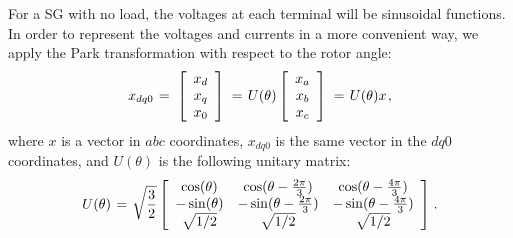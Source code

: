 \documentclass[letterpaper, 10 pt, conference]{ieeeconf}
\newcommand{\m}      {{\hbox{\hskip 1pt}}}
\begin{document}
For a SG with no load, the voltages at each terminal
will be sinusoidal functions. In order to represent the voltages and
currents in a more convenient way, we apply the Park transformation
with respect to the rotor angle:
$$ x_{dq0} \m=\m \left[\begin{array}{c} x_{d}\\ x_{q}\\ x_{0}
   \end{array}\right] \m=\m U(\theta) \left[\begin{array}{c} x_{a}\\
   x_b\\ x_c\end{array}\right] \m=\m U(\theta) x \m,$$
where $x$ is a vector in $abc$ coordinates, $x_{dq0}$
is the same vector in the $dq0$ coordinates, and $U(\theta)$ is the
following unitary matrix:
$$ U(\theta) \m=\m \sqrt{\frac{3}{2}}\left[\begin{array}{ccc}
   \cos(\theta) & \cos(\theta-\frac{2\pi}{3}) & \cos(\theta-
   \frac{4\pi}{3})\\ -\sin(\theta) & -\sin(\theta-\frac{2\pi}{3})
   & -\sin(\theta-\frac{4\pi}{3})\\ \sqrt{1/2} & \sqrt{1/2} & 
   \sqrt{1/2} \end{array}\right] \m.$$
\end{document}
